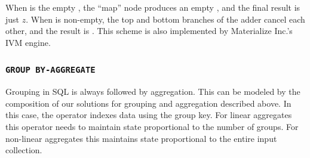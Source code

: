 \noindent When  is the empty \zr, the ``map'' node produces
an empty \zr, and the final result is just $z$.  When  is
non-empty, the top and bottom branches of the adder cancel each other,
and the result is .  This scheme is also implemented by
Materialize Inc.'s IVM engine.

\subsubsection{\texttt{GROUP BY-AGGREGATE}}

Grouping in SQL is always followed by aggregation.  This can be
modeled by the composition of our solutions for grouping and
aggregation described above.  In this case, the  operator
indexes data using the group key.  For linear aggregates this operator
needs to maintain state proportional to the number of groups.  For
non-linear aggregates this maintains state proportional to the entire
input collection.


